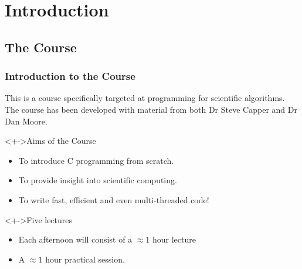 \documentclass[smaller,handout,table]{beamer}
\subtitle{Lecture 1 of 5}
\begin{document}
{
\begin{frame}
  \titlepage
\end{frame}
}

\section{Introduction}
\subsection{The Course}

\begin{frame}
\frametitle{Introduction to the Course}
This is a course specifically targeted at programming for scientific algorithms.\\
The course has been developed with material from both Dr Steve Capper and Dr Dan Moore.
\begin{block}<+->{Aims of the Course}
\begin{itemize}
\item To introduce C programming from scratch.
\item To provide insight into scientific computing.
\item To write fast, efficient and even multi-threaded code!
\end{itemize}
\end{block}

\begin{block}<+->{Five lectures}
\begin{itemize}
\item Each afternoon will consist of a $\approx 1$ hour lecture
\item A $\approx 1$ hour practical session.
\end{itemize}
\end{block}
\end{frame}
\end{document}
